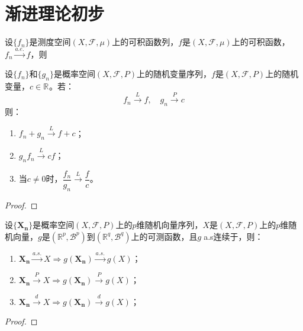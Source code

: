 \chapter{渐进理论初步}

\begin{theorem}
	设$\{f_n\}$是测度空间$(X,\mathscr{F},\mu)$上的可积函数列，$f$是$(X,\mathscr{F},\mu)$上的可积函数，$f_n\overset{a.e.}{\longrightarrow}f$，则
\end{theorem}
\begin{theorem}\label{theo:Slutsky}
	设$\{f_n\}$和$\{g_n\}$是概率空间$(X,\mathscr{F},P)$上的随机变量序列，$f$是$(X,\mathscr{F},P)$上的随机变量，$c\in\mathbb{R}^{}$。若：
	\begin{equation*}
		f_n\overset{L}{\longrightarrow}f,\quad g_n\overset{P}{\longrightarrow}c
	\end{equation*}
	则：
	\begin{enumerate}
		\item $f_n+g_n\overset{L}{\longrightarrow}f+c$；
		\item $g_nf_n\overset{L}{\longrightarrow}cf$；
		\item 当$c\ne0$时，$\dfrac{f_n}{g_n}\overset{L}{\longrightarrow}\dfrac{f}{c}$。
	\end{enumerate}
\end{theorem}
\begin{proof}
	
\end{proof}
\begin{theorem}
	设$\{\mathbf{X_n}\}$是概率空间$(X,\mathscr{F},P)$上的$p$维随机向量序列，$X$是$(X,\mathscr{F},P)$上的$p$维随机向量，$g$是$(\mathbb{R}^{p},\mathcal{B}^p)$到$(\mathbb{R}^{q},\mathcal{B}^q)$上的可测函数，且$g\;$a.s连续于，则：
	\begin{enumerate}
		\item $\mathbf{X_n}\overset{a.s.}{\longrightarrow}X\Rightarrow g(\mathbf{X_n})\overset{a.s.}{\longrightarrow}g(X)$；
		\item $\mathbf{X_n}\overset{P}{\longrightarrow}X\Rightarrow g(\mathbf{X_n})\overset{P}{\longrightarrow}g(X)$；
		\item $\mathbf{X_n}\overset{d}{\longrightarrow}X\Rightarrow g(\mathbf{X_n})\overset{d}{\longrightarrow}g(X)$；
	\end{enumerate}
\end{theorem}
\begin{proof}
	
\end{proof}



